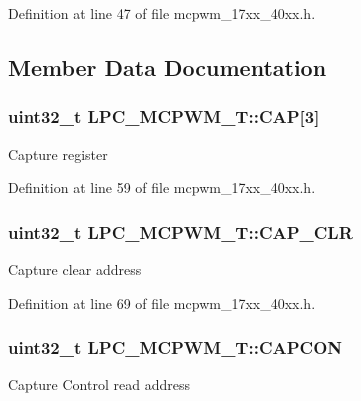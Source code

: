 Definition at line 47 of file mcpwm\+\_\+17xx\+\_\+40xx.\+h.



\subsection{Member Data Documentation}
\subsubsection[{\texorpdfstring{C\+AP}{CAP}}]{ uint32\+\_\+t L\+P\+C\+\_\+\+M\+C\+P\+W\+M\+\_\+\+T\+::\+C\+AP\mbox{[}3\mbox{]}}\hypertarget{structLPC__MCPWM__T_a015a4607abaca03f64acaeae4a0ccaf7}{}\label{structLPC__MCPWM__T_a015a4607abaca03f64acaeae4a0ccaf7}
Capture register 

Definition at line 59 of file mcpwm\+\_\+17xx\+\_\+40xx.\+h.

\subsubsection[{\texorpdfstring{C\+A\+P\+\_\+\+C\+LR}{CAP_CLR}}]{ uint32\+\_\+t L\+P\+C\+\_\+\+M\+C\+P\+W\+M\+\_\+\+T\+::\+C\+A\+P\+\_\+\+C\+LR}\hypertarget{structLPC__MCPWM__T_a88da2eb831f09cf7145f57c45b224e91}{}\label{structLPC__MCPWM__T_a88da2eb831f09cf7145f57c45b224e91}
Capture clear address 

Definition at line 69 of file mcpwm\+\_\+17xx\+\_\+40xx.\+h.

\subsubsection[{\texorpdfstring{C\+A\+P\+C\+ON}{CAPCON}}]{ uint32\+\_\+t L\+P\+C\+\_\+\+M\+C\+P\+W\+M\+\_\+\+T\+::\+C\+A\+P\+C\+ON}\hypertarget{structLPC__MCPWM__T_a47afe6c393cc7da61af1d48bfc0f709c}{}\label{structLPC__MCPWM__T_a47afe6c393cc7da61af1d48bfc0f709c}
Capture Control read address 

